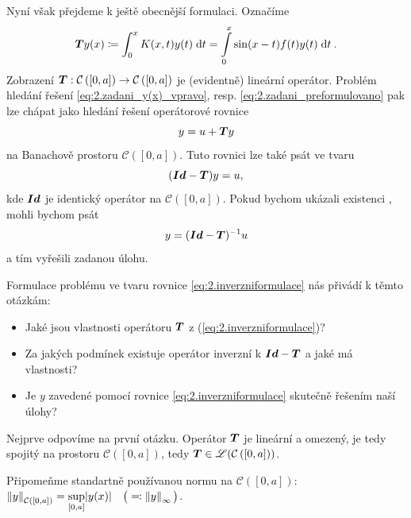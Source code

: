 Nyní však přejdeme k ještě obecnější formulaci. Označíme
\begin{equation}
     \boldsymbol{T} y(x)\coloneqq \int_0^x K(x,t)y(t)\;\mathrm{d}t=\int\limits_0^x \sin(x-t)f(t)y(t)\;\mathrm{d}t \:.
    \label{eq:2.obesnejsiformulaceTy}
\end{equation}
Zobrazení $ \boldsymbol{T} : \mathcal{C} \left( [0,a] \right) \rightarrow \mathcal{C}\left( [0,a] \right)$ je (evidentně) lineární operátor. Problém hledání řešení \eqref{eq:2.zadani_y(x)_vpravo}, resp. \eqref{eq:2.zadani_preformulovano} pak lze chápat jako hledání řešení operátorové rovnice
\begin{equation}
    y=u+ \boldsymbol{T} y
\end{equation}
na Banachově prostoru $\mathcal{C}([0,a])$. Tuto rovnici lze také psát ve tvaru
\begin{equation}
    (\boldsymbol{Id} - \boldsymbol{T} )y=u,
\end{equation}
kde $\boldsymbol{Id}$ je identický operátor na $\mathcal{C}([0,a])$. Pokud bychom ukázali existenci , mohli bychom psát
\begin{equation}
    y = (\boldsymbol{Id} - \boldsymbol{T} )^{-1}u
    \label{eq:2.inverzniformulace}
\end{equation}
a tím vyřešili zadanou úlohu.

Formulace problému ve tvaru rovnice \eqref{eq:2.inverzniformulace} nás přivádí k těmto otázkám:
\begin{itemize}
    \item Jaké jsou vlastnosti operátoru $ \boldsymbol{T} $ z (\ref{eq:2.inverzniformulace})?
    \item Za jakých podmínek existuje operátor inverzní k $\boldsymbol{Id} - \boldsymbol{T} $ a jaké má vlastnosti?
    \item Je $y$ zavedené pomocí rovnice \eqref{eq:2.inverzniformulace} skutečně řešením naší úlohy?
\end{itemize}
Nejprve odpovíme na první otázku. Operátor $ \boldsymbol{T} $ je lineární a omezený, je tedy spojitý na prostoru $\mathcal{C}([0,a])$, tedy $ \boldsymbol{T} \in \mathscr{L}(\mathcal{C}\left( [0,a]) \right)$.

Připomeňme standartně používanou normu na $\mathcal{C}([0,a])$: $\left\lVert y\right\rVert_{\mathcal{C}([0,a])} = \underset{[0,a]}{\sup} |y(x)| \quad \big(\eqqcolon \left\lVert y\right\rVert_\infty\big)$.


